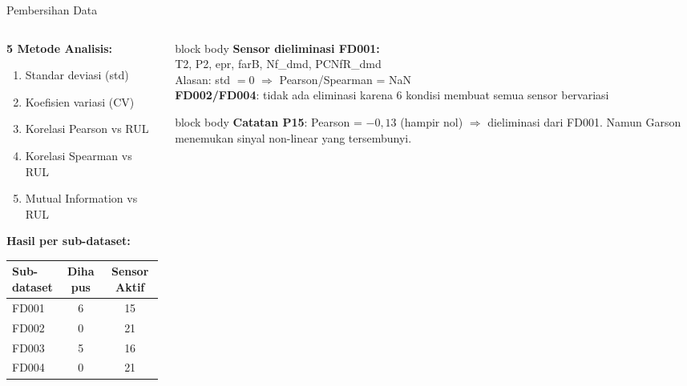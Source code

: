 \documentclass[aspectratio=169, 11pt]{beamer}
\begin{document}
\begin{frame}{Pembersihan Data}
  \begin{columns}[t]
    \begin{column}{0.48\textwidth}
      \textbf{5 Metode Analisis:}
      \begin{enumerate}
        \item Standar deviasi (std)
        \item Koefisien variasi (CV)
        \item Korelasi Pearson vs RUL
        \item Korelasi Spearman vs RUL
        \item Mutual Information vs RUL
      \end{enumerate}

      \vspace{0.3cm}
      \textbf{Hasil per sub-dataset:}
      \vspace{0.1cm}

      \small
      \begin{tabular}{lcc}
        \toprule
        Sub-dataset & Dihapus & Sensor Aktif \\
        \midrule
        FD001 & 6 & 15 \\
        FD002 & 0 & 21 \\
        FD003 & 5 & 16 \\
        FD004 & 0 & 21 \\
        \bottomrule
      \end{tabular}
    \end{column}
    \begin{column}{0.48\textwidth}
      \begin{beamercolorbox}[sep=4pt]{block body}
\color{uiblue}\small
          \textbf{Sensor dieliminasi FD001:}\\
          T2, P2, epr, farB, Nf\_dmd, PCNfR\_dmd\\[4pt]
          Alasan: std $= 0$ $\Rightarrow$
          Pearson/Spearman = NaN\\[4pt]
          \textbf{FD002/FD004}: tidak ada eliminasi
          karena 6 kondisi membuat semua sensor bervariasi
\end{beamercolorbox}

      \vspace{0.3cm}
      \begin{beamercolorbox}[sep=4pt]{block body}
\color{uiteal}\small
          \textbf{Catatan P15}:
          Pearson = $-0{,}13$ (hampir nol)
          $\Rightarrow$ dieliminasi dari FD001.
          Namun Garson menemukan sinyal non-linear
          yang tersembunyi.
\end{beamercolorbox}
    \end{column}
  \end{columns}
\end{frame}
\end{document}

